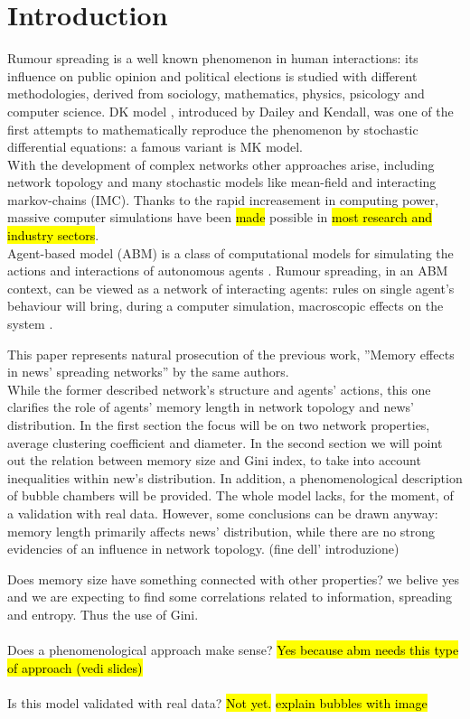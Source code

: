 \section{Introduction}
Rumour spreading is a well known phenomenon in human interactions:
its influence on public opinion \cite{publicoprumsp} and political elections \cite{politicalrumsp} is studied
with different methodologies, derived from sociology, mathematics,
physics, psicology and computer science.
DK model \cite{DKmodel}, introduced by Dailey and Kendall, was one of
the first attempts to mathematically reproduce the phenomenon by
stochastic differential equations: a famous variant is MK model\cite{MKmodel}.\\
With the development of complex networks other approaches arise,
including network topology and many stochastic models
like mean-field \cite{meanfield}and interacting markov-chains\cite{IMC} (IMC).
Thanks to the rapid increasement in computing power,
massive computer simulations have been \hl{made} possible in
\hl{most research and industry sectors}.\\
Agent-based model (ABM) is a class of computational models for
simulating the actions and interactions of autonomous agents \cite{Agentbased}.
Rumour spreading, in an ABM context, can be viewed as a network
of interacting agents: rules on single agent's behaviour
will bring, during a computer simulation, macroscopic
effects on the system \cite{Agentbased}.

This paper represents natural prosecution of the previous work,
''Memory effects in news' spreading networks'' by the same authors\cite{ourpaper}.\\
While the former described network's structure and agents' actions, this one clarifies 
the role of agents' memory length in network topology and news' distribution.
In the first section the focus will be on two network properties, average clustering coefficient and diameter.
In the second section we will point out the relation between memory size
and Gini index, to take into account inequalities within new's distribution.
In addition, a phenomenological description of bubble chambers will be provided.
The whole model lacks, for the moment, of a validation with real data.
However, some conclusions can be drawn anyway: memory length primarily affects 
news' distribution, while there are no strong evidencies of an influence in network topology.
(fine dell' introduzione)


Does memory size have something connected with other properties?
we belive yes and we are expecting to find some correlations related
to information, spreading and entropy. Thus the use of Gini.\\ \\
Does a phenomenological approach make sense? \hl{Yes because abm needs
this type of approach (vedi slides)}\\ \\
Is this model validated with real data? \hl{Not yet.}
\hl{explain bubbles with image}
